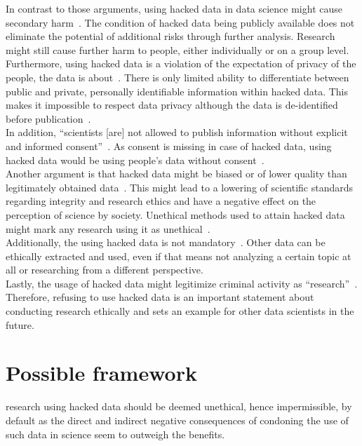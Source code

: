 In contrast to those arguments, using hacked data in data science might cause secondary harm~\parencites[][746]{nature}[23]{acm}.
The condition of hacked data being publicly available does not eliminate the potential of additional risks through further analysis.
Research might still cause further harm to people, either individually or on a group level.\\
Furthermore, using hacked data is a violation of the expectation of privacy of the people, the data is about~\parencite[][5]{patreon}.
There is only limited ability to differentiate between public and private, personally identifiable information within hacked data.
This makes it impossible to respect data privacy although the data is de-identified before publication~\parencite[][746]{nature}.\\
In addition, ``scientists [are] not allowed to publish information without explicit and informed consent''~\parencite[][745]{nature}.
As consent is missing in case of hacked data, using hacked data would be using people's data without consent~\parencite[][5]{patreon}.\\
Another argument is that hacked data might be biased or of lower quality than legitimately obtained data~\parencite[][746]{nature}.
This might lead to a lowering of scientific standards regarding integrity and research ethics and have a negative effect on the perception of science by society.
Unethical methods used to attain hacked data might mark any research using it as unethical~\parencite[][24]{acm}.\\
Additionally, the using hacked data is not mandatory~\parencite[][5]{patreon}.
Other data can be ethically extracted and used, even if that means not analyzing a certain topic at all or researching from a different perspective.\\
Lastly, the usage of hacked data might legitimize criminal activity as ``research''~\parencites[][5]{patreon}[][24]{acm}.
Therefore, refusing to use hacked data is an important statement about conducting research ethically and sets an example for other data scientists in the future.

\section*{Possible framework}


research using hacked data should
be deemed unethical, hence impermissible, by default as the direct
and indirect negative consequences of condoning the use of such
data in science seem to outweigh the benefits.~\parencite[][747]{nature}

